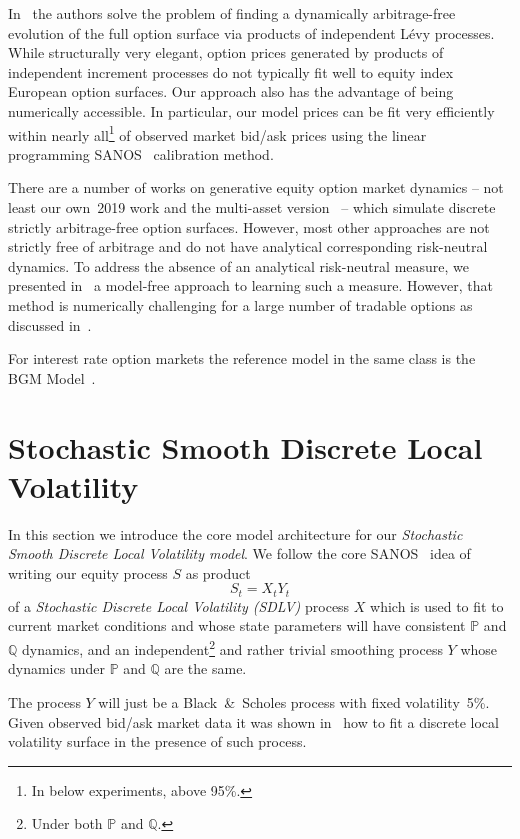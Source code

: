 \documentclass[11pt]{article}
\newcommand{\Q}{\mathbb Q}
\newcommand{\PP}{\mathbb P}
\theoremstyle{plain}
\theoremstyle{definition}
\theoremstyle{remark}
\begin{document}
In~\cite{TANGET} the 
authors solve the problem of finding a dynamically arbitrage-free evolution of the full option surface via products of independent L\'evy processes. While structurally
very elegant, option prices generated by products of independent increment processes do not typically fit well to equity index European option surfaces. 
Our approach also has the advantage of being numerically accessible.
In particular, our model prices can be fit very efficiently within nearly all\footnote{In below experiments, above 95\%.} of observed market bid/ask prices
using the  linear programming SANOS~\cite{SANOS2026} calibration method.

There are a number of works on generative equity option market dynamics -- not least our
own~2019 work \cite{WieseEtAl2019OptionMarkets} and the multi-asset version~\cite{WieseEtAl2021MultiAsset} -- which simulate
discrete strictly arbitrage-free option surfaces. However, most other approaches
are not strictly free of arbitrage and do not have analytical corresponding risk-neutral dynamics.
To address the absence of an analytical risk-neutral measure, we presented in~\cite{removedrift} 
a model-free approach
to learning such a measure. However,  that method is numerically challenging
for a large number of tradable options as discussed in~\cite{DYSANOS2026}.

For interest rate option markets the reference model in the same class is the BGM Model~\cite{BGM}.

\section{Stochastic Smooth Discrete Local Volatility}

In this section we introduce the core model architecture for our \emph{Stochastic 
Smooth Discrete Local Volatility model}.
We follow the core SANOS~\cite{SANOS2026} idea of writing our equity process $S$ as product
\begin{equation}
 \label{eq:S} 
  S_t = X_t Y_t 
\end{equation}
of a \emph{Stochastic Discrete Local Volatility (SDLV)} process $X$ which is used to fit to current market conditions and 
whose state parameters will have consistent $\PP$ and $\Q$ dynamics, and an independent\footnote{Under both $\PP$ and $\Q$.} and rather trivial smoothing process $Y$ whose dynamics under $\PP$ and $\Q$ are the same.

The process $Y$ will just be a Black~\&~Scholes process with fixed volatility~5\%. Given observed bid/ask market data it was shown in~\cite{SANOS2026} how to fit
a discrete local volatility surface in the presence of such process. 
\end{document}
